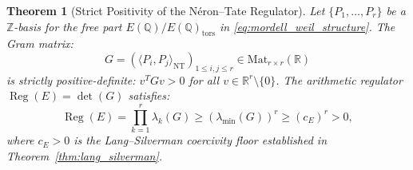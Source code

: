 \documentclass[11pt,reqno]{article}
\theoremstyle{plain}
\newtheorem{theorem}{Theorem}[section]
\theoremstyle{definition}
\DeclareMathOperator{\Reg}{Reg}
\begin{document}
\begin{theorem}[Strict Positivity of the Néron--Tate Regulator]
\label{thm:regulator_positivity_full}
Let $\{P_1, \dots, P_r\}$ be a $\mathbb{Z}$-basis for the free part $E(\mathbb{Q}) / E(\mathbb{Q})_{\mathrm{tors}}$ in \eqref{eq:mordell_weil_structure}. The Gram matrix:
\begin{equation}
    G = \left( \langle P_i, P_j \rangle_{\mathrm{NT}} \right)_{1 \le i, j \le r} \in \mathrm{Mat}_{r \times r}(\mathbb{R})
\end{equation}
is strictly positive-definite: $v^T G v > 0$ for all $v \in \mathbb{R}^r \setminus \{0\}$. The arithmetic regulator $\Reg(E) = \det(G)$ satisfies:
\begin{equation}
    \label{eq:reg_eigenvalue_bound}
    \Reg(E) = \prod_{k=1}^r \lambda_k(G) \ge \left( \lambda_{\min}(G) \right)^r \ge \left( c_E \right)^r > 0,
\end{equation}
where $c_E > 0$ is the Lang--Silverman coercivity floor established in Theorem~\ref{thm:lang_silverman}.
\end{theorem}
\end{document}

